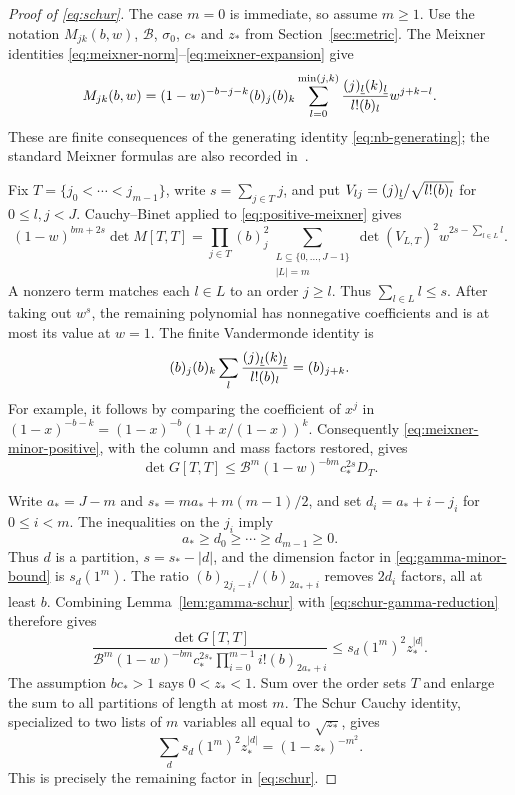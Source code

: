 \begin{proof}[Proof of \eqref{eq:schur}]
The case $m=0$ is immediate, so assume $m\geq1$. Use the notation
$M_{jk}(b,w)$, $\mathcal B$, $\sigma_0$, $c_*$ and $z_*$ from
Section~\ref{sec:metric}. The Meixner identities
\eqref{eq:meixner-norm}--\eqref{eq:meixner-expansion} give
\begin{equation}\label{eq:positive-meixner}
 M_{jk}(b,w)
 =(1-w)^{-b-j-k}(b)_j(b)_k
 \sum_{l=0}^{\min(j,k)}
 \frac{(j)_{\underline{l}}(k)_{\underline{l}}}{l!(b)_l}w^{j+k-l}.
\end{equation}
These are finite consequences of the generating identity
\eqref{eq:nb-generating}; the standard Meixner formulas are also recorded
in~\cite[Sections~18.19 and~18.23]{dlmf}.

Fix $T=\{j_0<\cdots<j_{m-1}\}$, write $s=\sum_{j\in T}j$, and put
$V_{lj}=(j)_{\underline{l}}/\sqrt{l!(b)_l}$ for $0\leq l,j<J$.
Cauchy--Binet applied to \eqref{eq:positive-meixner} gives
\begin{equation}\label{eq:meixner-minor-positive}
 (1-w)^{bm+2s}\det M[T,T]
 =\prod_{j\in T}(b)_j^2
   \sum_{\substack{L\subseteq\{0,\ldots,J-1\}\\|L|=m}}
      \det(V_{L,T})^2w^{2s-\sum_{l\in L}l}.
\end{equation}
A nonzero term matches each $l\in L$ to an order $j\geq l$.
Thus $\sum_{l\in L}l\leq s$. After taking out $w^s$, the remaining
polynomial has nonnegative coefficients and is at most its value at
$w=1$. The finite Vandermonde identity is
\[
 (b)_j(b)_k\sum_l\frac{(j)_{\underline{l}}(k)_{\underline{l}}}{l!(b)_l}=(b)_{j+k}.
\]
For example, it follows by comparing the coefficient of $x^j$ in
$(1-x)^{-b-k}=(1-x)^{-b}(1+x/(1-x))^k$.
Consequently \eqref{eq:meixner-minor-positive}, with the column and
mass factors restored, gives
\begin{equation}\label{eq:schur-gamma-reduction}
 \det G[T,T]\leq\mathcal B^m(1-w)^{-bm}c_*^{2s}D_T.
\end{equation}

Write $a_*=J-m$ and $s_*=ma_*+m(m-1)/2$, and set
$d_i=a_*+i-j_i$ for $0\leq i<m$. The inequalities on the $j_i$ imply
\[
 a_*\geq d_0\geq\cdots\geq d_{m-1}\geq0.
\]
Thus $d$ is a partition, $s=s_*-|d|$, and the dimension factor in
\eqref{eq:gamma-minor-bound} is $s_d(1^m)$.
The ratio $(b)_{2j_i-i}/(b)_{2a_*+i}$ removes $2d_i$ factors, all
at least $b$. Combining Lemma~\ref{lem:gamma-schur} with
\eqref{eq:schur-gamma-reduction} therefore gives
\[
 \frac{\det G[T,T]}
 {\mathcal B^m(1-w)^{-bm}c_*^{2s_*}
                         \prod_{i=0}^{m-1}i!(b)_{2a_*+i}}
 \leq s_d(1^m)^2 z_*^{|d|}.
\]
The assumption $bc_*>1$ says $0<z_*<1$. Sum over the order sets $T$
and enlarge the sum to all partitions of length at most $m$.
The Schur Cauchy identity, specialized to two lists of $m$ variables
all equal to $\sqrt{z_*}$, gives
\[
 \sum_d s_d(1^m)^2z_*^{|d|}=(1-z_*)^{-m^2}.
\]
This is precisely the remaining factor in \eqref{eq:schur}.
\end{proof}

